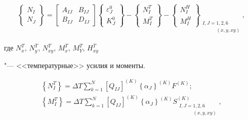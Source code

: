 \begin{gather}

\label{bitkina:eq8}

\left\{ \begin{array}{c}

N_I    \\

N_J

\end{array} \right\}=\begin{bmatrix}

A_{I\!J}    &  B_{I\!J}   \\

B_{I\!J}    &  D_{I\!J}

\end{bmatrix} \left\{ \begin{array}{c}

\varepsilon _J^0    \\

K_J^0

\end{array} \right\}-\left\{ \begin{array}{c}

N_I^T   \\

M_I^T

\end{array} \right\}-\left\{ \begin{array}{c}

N_I^H    \\

M_I^H

\end{array} \right\}_{\substack{I, J=1, 2, 6 \\

\phantom{I, J=}(x, y, xy)}},

\end{gather}

где $N_x^T$, $N_y^T$, $N_{xy}^T$, $M_x^T$, $M_Y^T$, $H_{xy}^T$

"--- <<температурные>> усилия и моменты.

\begin{equation}

\label{bitkina:eq9}

\begin{array}{c}

\left\{ N_I^T \right\}=\Delta T \sum\limits_{k=1}^N \left[ Q_{I\!J} \right]^{( K )} \left\{ \alpha _J  \right\}^{( K)}F^{ (K)}; \\

\left\{ M_I^T \right\}=\Delta T \sum\limits_{k=1}^N \left[ Q_{I\!J} \right]^{( K )} \left\{ \alpha _J  \right\}^{( K )}S^{( K )}_{\substack{I, J=1, 2, 6 \\

\phantom{I, J=}(x, y, xy)}},

 \end{array}

\end{equation}

